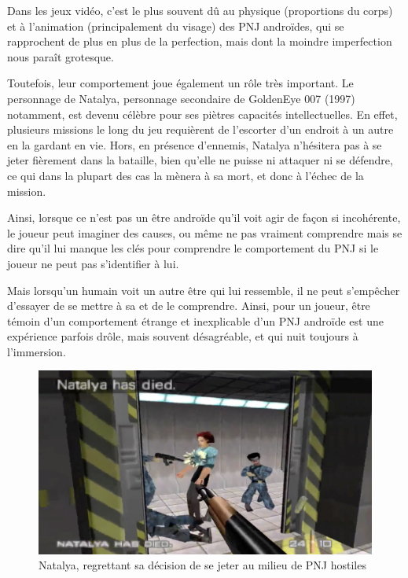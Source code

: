 \documentclass[a4paper, 12pt]{article} %
\begin{document}
Dans les jeux vidéo, c’est le plus souvent dû au physique (proportions du corps) et à l’animation (principalement du visage) des PNJ androïdes, qui se rapprochent de plus en plus de la perfection, mais dont la moindre imperfection nous paraît grotesque.


Toutefois, leur comportement joue également un rôle très important. Le personnage de Natalya, personnage secondaire de GoldenEye 007 (1997) notamment, est devenu célèbre pour ses piètres capacités intellectuelles. En effet, plusieurs missions le long du jeu requièrent de l’escorter d’un endroit à un autre en la gardant en vie. Hors, en présence d’ennemis, Natalya n’hésitera pas à se jeter fièrement dans la bataille, bien qu’elle ne puisse ni attaquer ni se défendre, ce qui dans la plupart des cas la mènera à sa mort, et donc à l’échec de la mission.

\newpage
Ainsi, lorsque ce n’est pas un être androïde qu’il voit agir de façon si incohérente, le joueur peut imaginer des causes, ou même ne pas vraiment comprendre mais se dire qu’il lui manque les clés pour comprendre le comportement du PNJ si le joueur ne peut pas s’identifier à lui. 

Mais lorsqu’un humain voit un autre être qui lui ressemble, il ne peut s’empêcher d’essayer de se mettre à sa et de le comprendre. Ainsi, pour un joueur, être témoin d’un comportement étrange et inexplicable d’un PNJ androïde est une expérience parfois drôle, mais souvent désagréable, et qui nuit toujours à l’immersion.

\begin{figure}[!h]%
	\begin{center} 
		\includegraphics[width=0.60\columnwidth]{images/natalya.png}%
		\caption{Natalya, regrettant sa décision de se jeter au milieu de PNJ hostiles}%
	\end{center}
\end{figure}
\end{document}
